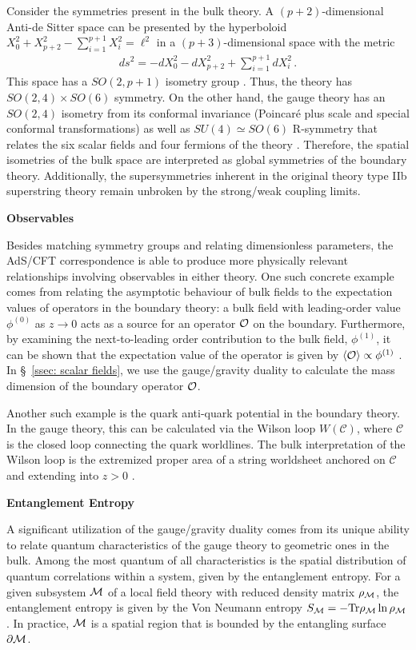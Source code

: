 \documentclass[../PhD.tex]{subfiles}
\begin{document}
Consider the symmetries present in the \ads bulk theory. A $(p+2)$-dimensional Anti-de Sitter space can be presented by the hyperboloid $X_0^2 + X^2_{p+2} - \sum^{p+1}_{i=1} X_i^2 = \ell^2$ in a $(p+3)$-dimensional space with the metric
\begin{align}
\label{ads hyperboloid}
ds^2 = -dX_0^2 - dX_{p+2}^2 + \sum^{p+1}_{i = 1} dX^2_i \, .
\end{align}
This space has a $SO(2,p+1)$ isometry group \cite{hep-th/9905111}. Thus, the \ads theory has $SO(2,4)\times SO(6)$ symmetry. On the other hand, the gauge theory has an $SO(2,4)$ isometry from its conformal invariance (Poincar\'e plus scale and special conformal transformations) as well as $SU(4) \simeq SO(6)$ R-symmetry that relates the six scalar fields and four fermions of the theory \cite{1501.00007}. Therefore, the spatial isometries of the bulk space are interpreted as global symmetries of the boundary theory. Additionally, the supersymmetries inherent in the original theory type IIb superstring theory remain unbroken by the strong/weak coupling limits.
	
{\bf Observables}

Besides matching symmetry groups and relating dimensionless parameters, the AdS/CFT correspondence is able to produce more physically relevant relationships involving observables in either theory. One such concrete example comes from relating the asymptotic behaviour of bulk fields to the expectation values of operators in the boundary theory: a bulk field with leading-order value $\phi^{(0)}$ as $z \to 0$ acts as a source for an operator $\mathcal O$ on the boundary. Furthermore, by examining the next-to-leading order contribution to the bulk field, $\phi^{(1)}$, it can be shown that the expectation value of the operator is given by $\langle \mathcal O \rangle \propto \phi^{(1)}$ \cite{hep-th/9905104}. In \S~\!\ref{ssec: scalar fields}, we use the gauge/gravity duality to calculate the mass dimension of the boundary operator $\mathcal O$.

Another such example is the quark anti-quark potential in the boundary theory. In the gauge theory, this can be calculated via the Wilson loop $W(\mathcal C)$, where $\mathcal C$ is the closed loop connecting the quark worldlines. The bulk interpretation of the Wilson loop is the extremized proper area of a string worldsheet anchored on $\mathcal C$ and extending into $z > 0$ \cite{hep-th/9803002}. 

{\bf Entanglement Entropy}

A significant utilization of the gauge/gravity duality comes from its unique ability to relate quantum characteristics of the gauge theory to geometric ones in the bulk. Among the most quantum of all characteristics is the spatial distribution of quantum correlations within a system, given by the entanglement entropy. For a given subsystem $\mathcal M$ of a local field theory with reduced density matrix $\rho_{\mathcal M}$, the entanglement entropy is given by the Von Neumann entropy $S_{\mathcal M} = - \text{Tr} \rho_{\mathcal M} \ln \rho_{\mathcal M}$. In practice, $\mathcal M$ is a spatial region that is bounded by the entangling surface $\partial \mathcal M$.
\end{document}
